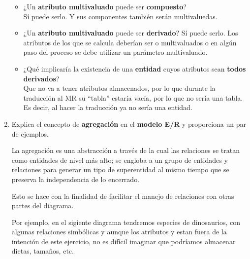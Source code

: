 \documentclass{article}
\begin{document}
\begin{enumerate}[label = (\alph*)]
{\begin{itemize}
                    nunca cambien. De cualquier manera, en caso de que se 
                    requiera usar un atributo derivado como llave, sería más 
                    eficiente usar como llave (tal vez compuesta) los atributos
                    que se usaron para calcularla.
                \item ¿Un \textbf{atributo multivaluado} puede ser 
                \textbf{compuesto}? \\
                    Sí puede serlo. Y sus componentes también serán multivaluedas.
                \item ¿Un \textbf{atributo multivaluado} puede ser \textbf{derivado}?
                    Sí puede serlo. Los atributos de los que se calcula deberían
                    ser o multivaluados o en algún paso del proceso se debe 
                    utilizar un parámetro multivaluado.
                \item ¿Qué implicaría la existencia de una \textbf{entidad} cuyos
                atributos sean \textbf{todos derivados}? \\
                    Que no va a tener atributos almacenados, por lo que durante la 
                    traducción al MR su ``tabla'' estaría vacía, por lo que no sería
                    una tabla. Es decir, al hacer la traducción ya no sería una 
                    entidad.
            \end{itemize} 
        }
        \item {
            Explica el concepto de \textbf{agregación} en el \textbf{modelo E/R}
            y proporciona un par de ejemplos. 
            
            La agregación es una abstracción a través de la cual las relaciones se
            tratan como entidades de nivel más alto; se engloba a un
            grupo de entidades y relaciones para generar un tipo de superentidad
            al mismo tiempo que se preserva la independencia de lo encerrado.
            
            Esto se hace con la finalidad de facilitar el manejo de relaciones
            con otras partes del diagrama.
            
            Por ejemplo, en el sigiente diagrama tendremos especies de 
            dinosaurios, con algunas relaciones simbólicas y aunque los
            atributos y estan fuera de la intención de este ejercicio, no es
            difícil imaginar que podríamos almacenar dietas, tamaños, etc.
            
}
\end{enumerate}
\end{document}
